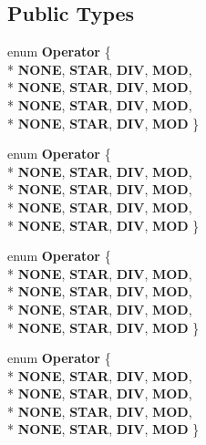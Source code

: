 \subsection*{Public Types}
\begin{DoxyCompactItemize}
\item 
enum {\bfseries Operator} \{ \\*
{\bfseries N\-O\-N\-E}, 
{\bfseries S\-T\-A\-R}, 
{\bfseries D\-I\-V}, 
{\bfseries M\-O\-D}, 
\\*
{\bfseries N\-O\-N\-E}, 
{\bfseries S\-T\-A\-R}, 
{\bfseries D\-I\-V}, 
{\bfseries M\-O\-D}, 
\\*
{\bfseries N\-O\-N\-E}, 
{\bfseries S\-T\-A\-R}, 
{\bfseries D\-I\-V}, 
{\bfseries M\-O\-D}, 
\\*
{\bfseries N\-O\-N\-E}, 
{\bfseries S\-T\-A\-R}, 
{\bfseries D\-I\-V}, 
{\bfseries M\-O\-D}
 \}
\item 
enum {\bfseries Operator} \{ \\*
{\bfseries N\-O\-N\-E}, 
{\bfseries S\-T\-A\-R}, 
{\bfseries D\-I\-V}, 
{\bfseries M\-O\-D}, 
\\*
{\bfseries N\-O\-N\-E}, 
{\bfseries S\-T\-A\-R}, 
{\bfseries D\-I\-V}, 
{\bfseries M\-O\-D}, 
\\*
{\bfseries N\-O\-N\-E}, 
{\bfseries S\-T\-A\-R}, 
{\bfseries D\-I\-V}, 
{\bfseries M\-O\-D}, 
\\*
{\bfseries N\-O\-N\-E}, 
{\bfseries S\-T\-A\-R}, 
{\bfseries D\-I\-V}, 
{\bfseries M\-O\-D}
 \}
\item 
enum {\bfseries Operator} \{ \\*
{\bfseries N\-O\-N\-E}, 
{\bfseries S\-T\-A\-R}, 
{\bfseries D\-I\-V}, 
{\bfseries M\-O\-D}, 
\\*
{\bfseries N\-O\-N\-E}, 
{\bfseries S\-T\-A\-R}, 
{\bfseries D\-I\-V}, 
{\bfseries M\-O\-D}, 
\\*
{\bfseries N\-O\-N\-E}, 
{\bfseries S\-T\-A\-R}, 
{\bfseries D\-I\-V}, 
{\bfseries M\-O\-D}, 
\\*
{\bfseries N\-O\-N\-E}, 
{\bfseries S\-T\-A\-R}, 
{\bfseries D\-I\-V}, 
{\bfseries M\-O\-D}
 \}
\item 
enum {\bfseries Operator} \{ \\*
{\bfseries N\-O\-N\-E}, 
{\bfseries S\-T\-A\-R}, 
{\bfseries D\-I\-V}, 
{\bfseries M\-O\-D}, 
\\*
{\bfseries N\-O\-N\-E}, 
{\bfseries S\-T\-A\-R}, 
{\bfseries D\-I\-V}, 
{\bfseries M\-O\-D}, 
\\*
{\bfseries N\-O\-N\-E}, 
{\bfseries S\-T\-A\-R}, 
{\bfseries D\-I\-V}, 
{\bfseries M\-O\-D}, 
\\*
{\bfseries N\-O\-N\-E}, 
{\bfseries S\-T\-A\-R}, 
{\bfseries D\-I\-V}, 
{\bfseries M\-O\-D}
 \}
\end{DoxyCompactItemize}
